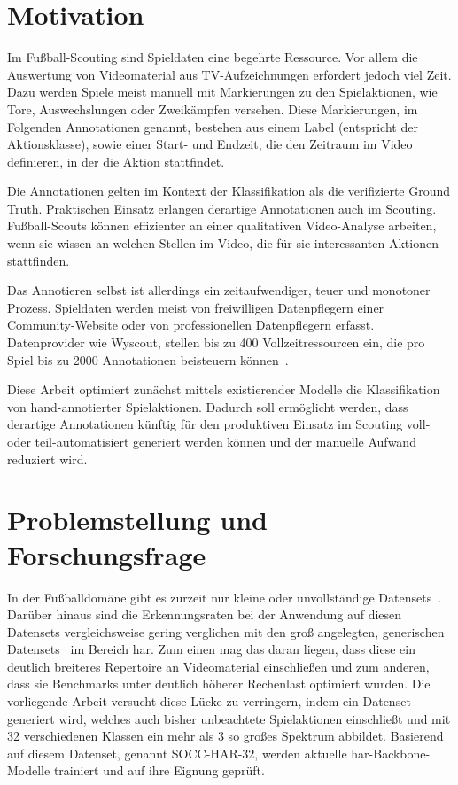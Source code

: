\section{Motivation}
\label{sec:motivation}

Im Fußball-Scouting sind Spieldaten eine begehrte Ressource.
Vor allem die Auswertung von Videomaterial aus TV-Aufzeichnungen erfordert jedoch viel Zeit.
Dazu werden Spiele meist manuell mit Markierungen zu den Spielaktionen, wie Tore, Auswechslungen oder Zweikämpfen versehen.
Diese Markierungen, im Folgenden Annotationen genannt, bestehen aus einem Label (entspricht der Aktionsklasse), sowie einer Start- und Endzeit, die den Zeitraum im Video definieren, in der die Aktion stattfindet.

Die Annotationen gelten im Kontext der Klassifikation als die \sog verifizierte Ground Truth.
Praktischen Einsatz erlangen derartige Annotationen auch im Scouting.
Fußball-Scouts können \zB effizienter an einer qualitativen Video-Analyse arbeiten, wenn sie wissen an welchen Stellen im Video, die für sie interessanten Aktionen stattfinden.

Das Annotieren selbst ist allerdings ein zeitaufwendiger, teuer und monotoner Prozess.
Spieldaten werden meist von freiwilligen Datenpflegern einer Community-Website oder von professionellen Datenpflegern erfasst.
Datenprovider wie Wyscout, stellen bis zu 400 Vollzeitressourcen ein, die pro Spiel bis zu 2000 Annotationen beisteuern können~\cite{Jiang19}.

Diese Arbeit optimiert zunächst mittels existierender Modelle die Klassifikation von hand-annotierter Spielaktionen.
Dadurch soll ermöglicht werden, dass derartige Annotationen künftig für den produktiven Einsatz im Scouting voll- oder teil-automatisiert generiert werden können und der manuelle Aufwand reduziert wird.

\section{Problemstellung und Forschungsfrage}
\label{sec:forschungsfrage}

In der Fußballdomäne gibt es zurzeit nur kleine oder unvollständige Datensets~\cite{Giancola18, Jiang19}.
Darüber hinaus sind die Erkennungsraten bei der Anwendung auf diesen Datensets vergleichsweise gering verglichen mit den groß angelegten, generischen Datensets~\cite{Kay17,Karpathy14} im Bereich \gls{har}.
Zum einen mag das daran liegen, dass diese ein deutlich breiteres Repertoire an Videomaterial einschließen und zum anderen, dass sie Benchmarks unter deutlich höherer Rechenlast optimiert wurden.
Die vorliegende Arbeit versucht diese Lücke zu verringern, indem ein Datenset generiert wird, welches auch bisher unbeachtete Spielaktionen einschließt und mit 32 verschiedenen Klassen ein mehr als 3 so großes Spektrum abbildet.
Basierend auf diesem Datenset, genannt SOCC-HAR-32, werden aktuelle \gls{har}-Backbone-Modelle trainiert und auf ihre Eignung geprüft.

